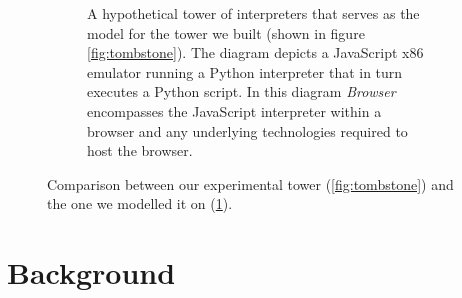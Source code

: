 \documentclass[a4paper,12pt,twoside,openright]{report}
\theoremstyle{definition}
\begin{document}
\begin{figure}[htp!]
\begin{subfigure}[htp!]{\linewidth}
            \caption{A hypothetical tower of interpreters that serves as the model for the tower we built (shown in figure \ref{fig:tombstone}). The diagram depicts a JavaScript x86 emulator running a Python interpreter that in turn executes a Python script. In this diagram \textit{Browser} encompasses the JavaScript interpreter within a browser and any underlying technologies required to host the browser.}
            \label{fig:tombstone_practical}
    \end{subfigure}
    \caption{Comparison between our experimental tower (\ref{fig:tombstone}) and the one we modelled it on  (\ref{fig:tombstone_practical}).}
    \label{fig:tombstone_all}
\end{figure}
\newpage

\section{Background}\label{sec:background}
\end{document}
